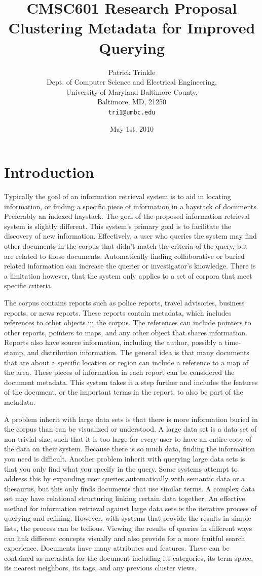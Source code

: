 \documentclass[11pt]{article}
\title{CMSC601 Research Proposal\\Clustering Metadata for Improved Querying}
\author{Patrick Trinkle\\
Dept. of Computer Science and Electrical Engineering,\\
University of Maryland Baltimore County,\\
Baltimore, MD, 21250\\
\texttt{tri1@umbc.edu}}
\date{May 1st, 2010}
\begin{document}
\maketitle

\section{Introduction}

Typically the goal of an information retrieval system is to aid in locating information, or finding a specific piece of information in a haystack of documents.
Preferably an indexed haystack.
The goal of the proposed information retrieval system is slightly different.
This system's primary goal is to facilitate the discovery of new information.
Effectively, a user who queries the system may find other documents in the corpus that didn't match the criteria of the query, but are related to those documents.
Automatically finding collaborative or buried related information can increase the querier or investigator's knowledge.
There is a limitation however, that the system only applies to a set of corpora that meet specific criteria.

The corpus contains reports such as police reports, travel advisories, business reports, or news reports.
These reports contain metadata, which includes references to other objects in the corpus.
The references can include pointers to other reports, pointers to maps, and any other object that shares information.
Reports also have source information, including the author, possibly a time-stamp, and distribution information.
The general idea is that many documents that are about a specific location or region can include a reference to a map of the area.
These pieces of information in each report can be considered the document metadata.
This system takes it a step further and includes the features of the document, or the important terms in the report, to also be part of the metadata.

A problem inherit with large data sets is that there is more information buried in the corpus than can be visualized or understood.
A large data set is a data set of non-trivial size, such that it is too large for every user to have an entire copy of the data on their system.
Because there is so much data, finding the information you need is difficult.
Another problem inherit with querying large data sets is that you only find what you specify in the query.
Some systems attempt to address this by expanding user queries automatically with semantic data or a thesaurus, but this only finds documents that use similar terms.
A complex data set may have relational structuring linking certain data together.
An effective method for information retrieval against large data sets is the iterative process of querying and refining.
However, with systems that provide the results in simple lists, the process can be tedious.
Viewing the results of queries in different ways can link different concepts visually and also provide for a more fruitful search experience.
Documents have many attributes and features.
These can be contained as metadata for the document including its categories, its term space, its nearest neighbors, its tags, and any previous cluster views.
\end{document}
